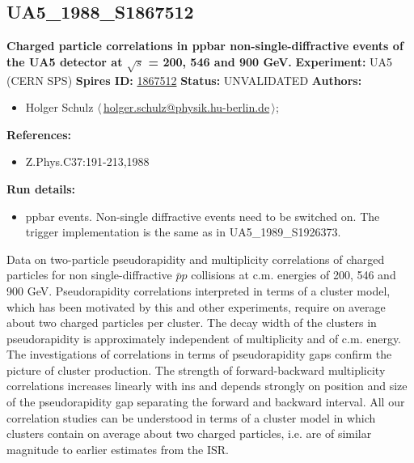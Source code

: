 \clearpage

\subsection[UA5\_1988\_S1867512]{UA5\_1988\_S1867512\,\cite{Ansorge:1988fg}}
\textbf{Charged particle correlations in ppbar non-single-diffractive events of the UA5 detector at \ensuremath{\sqrt{s}} = 200, 546 and 900 GeV.}\newline
\textbf{Experiment:} UA5 (CERN SPS) \newline
\textbf{Spires ID:} \href{http://www.slac.stanford.edu/spires/find/hep/www?rawcmd=key+1867512}{1867512}\newline
\textbf{Status:} UNVALIDATED\newline
\textbf{Authors:}
\begin{itemize}
  \item Holger Schulz $\langle\,$\href{mailto:holger.schulz@physik.hu-berlin.de}{holger.schulz@physik.hu-berlin.de}$\,\rangle$;
\end{itemize}
\textbf{References:}
\begin{itemize}
  \item Z.Phys.C37:191-213,1988
\end{itemize}
\textbf{Run details:}
\begin{itemize}

  \item ppbar events. Non-single diffractive events need to be switched on. The trigger implementation is the same as in UA5_1989_S1926373.\end{itemize}

\noindent Data on two-particle pseudorapidity and multiplicity correlations  of charged particles for non single-diffractive $\bar{p}p$ collisions at  c.m. energies of 200, 546 and 900 GeV. Pseudorapidity correlations interpreted  in terms of a cluster model, which has been motivated by this and other  experiments, require on average about two charged particles per cluster.  The decay width of the clusters in pseudorapidity is approximately independent  of multiplicity and of c.m. energy. The investigations of correlations in terms  of pseudorapidity gaps confirm the picture of cluster production. The strength  of forward-backward multiplicity correlations increases linearly with ins and  depends strongly on position and size of the pseudorapidity gap separating  the forward and backward interval. All our correlation studies can be understood  in terms of a cluster model in which clusters contain on average about two  charged particles, i.e. are of similar magnitude to earlier estimates from the ISR.

